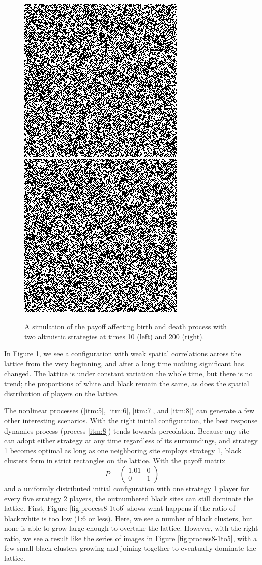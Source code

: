 \documentclass[notitlepage,reqno]{amsart}
\begin{document}
\begin{figure}[h]
\includegraphics[width=.4\textwidth]{./images/Time10-Process0.png}
\includegraphics[width=.4\textwidth]{./images/Time1000-Process0.png}
\caption{A simulation of the payoff affecting birth and death process
  with two altruistic strategies at times 10 (left) and 200 (right).}
\label{fig:proc1coexistence}
\end{figure}

In Figure \ref{fig:proc1coexistence}, we see a configuration with weak
spatial correlations
across the lattice from the very beginning, and after a long time
nothing significant has changed. The lattice is under constant
variation the whole time, but there is no trend; the proportions of
white and black remain the same, as does the spatial distribution of
players on the lattice.

The nonlinear processes (\ref{itm:5}, \ref{itm:6}, \ref{itm:7}, and
\ref{itm:8}) can generate a few other interesting scenarios. With the
right initial configuration, the best response dynamics process
(process \ref{itm:8}) tends towards percolation. Because any site can
adopt either strategy at any time regardless of its surroundings, and
strategy 1 becomes optimal as long as one neighboring site employs
strategy 1, black clusters form in strict rectangles on the
lattice. With the payoff matrix
\[
    P = \begin{pmatrix}
      1.01 & 0 \\
      0 & 1
   \end{pmatrix}
\]
and a uniformly distributed initial configuration with one strategy 1
player for every five strategy 2 players, the outnumbered black sites
can still dominate the lattice. First, Figure \ref{fig:process8-1to6}
shows what happens if the ratio of black:white is too low (1:6 or
less). Here, we see a number of black clusters, but none is able to
grow large enough to overtake the lattice. However, with the right
ratio, we see a result like the series of images in Figure
\ref{fig:process8-1to5}, with a few small black clusters growing and
joining together to eventually dominate the lattice.
\end{document}
